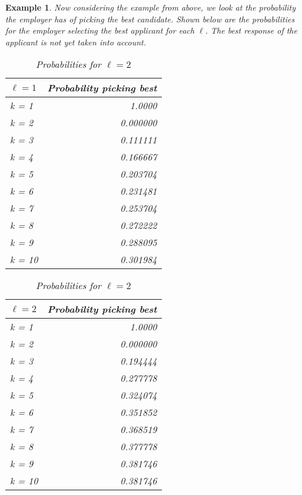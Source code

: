 \documentclass{article}
\newtheorem{example}{Example} %
\begin{document}
\begin{example}

Now considering the example from above, we look at the probability the employer has of picking the best candidate. Shown below are the probabilities for the employer selecting the best applicant for each $\ell$. The best response of the applicant is not yet taken into account.

\begin{table}[H]
\centering
\begin{minipage}{0.33\textwidth}

\label{tab:table2}
\small
\begin{tabular}{lr}
\hline
$\ell=1$ & Probability picking best  \\
\hline
k = 1  &     1.0000  \\
k = 2  &     0.000000  \\
k = 3  &     0.111111  \\
k = 4  &     0.166667  \\
k = 5  &     0.203704  \\
k = 6  &     0.231481  \\
k = 7  &     0.253704 \\
k = 8  &     0.272222  \\
k = 9  &     0.288095  \\
k = 10 &     0.301984  \\
\hline
\end{tabular}
\caption{Probabilities for $\ell=1$}
\end{minipage}\hfill
\centering
\begin{minipage}{0.33\textwidth}
\small
\begin{tabular}{lr}
\hline
$\ell=2$ & Probability picking best \\
\hline
k = 1  &     1.0000  \\
k = 2  &     0.000000  \\
k = 3  &     0.194444  \\
k = 4  &     0.277778  \\
k = 5  &     0.324074  \\
k = 6  &     0.351852  \\
k = 7  &     0.368519 \\
k = 8  &     0.377778  \\
k = 9  &     0.381746  \\
k = 10 &     0.381746  \\
\hline
\end{tabular}
\caption{Probabilities for $\ell=2$}
\end{minipage}\hfill

\end{table}
\end{example}
\end{document}
